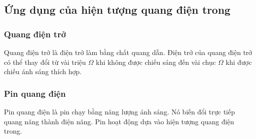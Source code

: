 \subsection{Ứng dụng của hiện tượng quang điện trong}
\subsubsection{Quang điện trở}
	Quang điện trở là điện trở làm bằng chất quang dẫn. Điện trở của quang điện trở có thể thay đổi từ vài triệu $\Omega$ khi không được chiếu sáng đến vài chục $\Omega$ khi được chiếu ánh sáng thích hợp.
\subsubsection{Pin quang điện}
	Pin quang điện là pin chạy bằng năng lượng ánh sáng. Nó biến đổi trực tiếp quang năng thành điện năng. Pin hoạt động dựa vào hiện tượng quang điện trong.